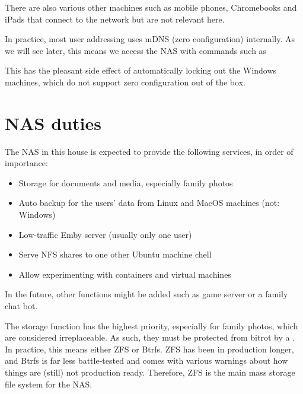 \documentclass[a4paper,10pt,english]{sphinxmanual}
\begin{document}
There are also various other machines such as mobile phones, Chromebooks and
iPads that connect to the network but are not relevant here.

In practice, most user addressing uses mDNS (zero configuration) internally. As
we will see later, this means we access the NAS with commands such as

\begin{sphinxVerbatim}[commandchars=\\\{\}]
 
\end{sphinxVerbatim}

This has the pleasant side effect of automatically locking out the Windows
machines, which do not support zero configuration out of the box.


\section{NAS duties}
\label{\detokenize{goals:nas-duties}}
The NAS in this house is expected to provide the following services, in order of
importance:
\begin{itemize}
\item {} 
Storage for documents and media, especially family photos

\item {} 
Auto backup for the users’ data from Linux and MacOS machines (not: Windows)

\item {} 
Low-traffic Emby server (usually only one user)

\item {} 
Serve NFS shares to one other Ubuntu machine chell

\item {} 
Allow experimenting with containers and virtual machines

\end{itemize}

In the future, other functions might be added such as game server or a family
chat bot.

The storage function has the highest priority, especially for family photos,
which are considered irreplaceable. As such, they must be protected from bitrot
by a . In practice, this means either ZFS or Btrfs. ZFS
has been in production longer, and Btrfs is far less battle-tested and comes
with various warnings about how things are (still) not production ready.
Therefore, ZFS is the main mass storage file system for the NAS.
\end{document}
